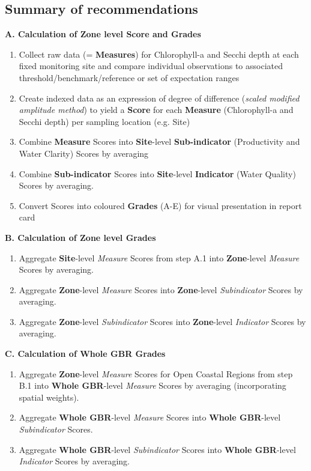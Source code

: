
 

\subsection{Summary of recommendations}


\begin{minipage}[t]{\textwidth}
\textbf{A. Calculation of Zone level Score and Grades}
\begin{enumerate}
\item Collect raw data (= \textbf{Measures}) for Chlorophyll-a and Secchi depth at each fixed monitoring site and compare individual observations to associated threshold/benchmark/reference or set of expectation ranges
\item Create indexed data as an expression of degree of difference (\textit{scaled modified amplitude method}) to yield a \textbf{Score} for each \textbf{Measure} (Chlorophyll-a and Secchi depth) per sampling location (e.g. Site)
\item Combine \textbf{Measure} Scores into \textbf{Site}-level \textbf{Sub-indicator} (Productivity and Water Clarity) Scores by averaging  
\item Combine \textbf{Sub-indicator} Scores into \textbf{Site}-level \textbf{Indicator} (Water Quality) Scores by averaging.
\item Convert Scores into coloured \textbf{Grades} (A-E) for visual presentation in report card
\end{enumerate}
\textbf{B.     Calculation of Zone level Grades}
\begin{enumerate}
\item Aggregate \textbf{Site}-level \textit{Measure} Scores from step A.1 into \textbf{Zone}-level \textit{Measure} Scores by averaging.
\item Aggregate \textbf{Zone}-level \textit{Measure} Scores into \textbf{Zone}-level \textit{Subindicator} Scores by averaging.
\item Aggregate \textbf{Zone}-level \textit{Subindicator} Scores into \textbf{Zone}-level \textit{Indicator} Scores by averaging.
\end{enumerate}
\textbf{C.     Calculation of Whole GBR Grades}
\begin{enumerate}
\item Aggregate \textbf{Zone}-level \textit{Measure} Scores for Open Coastal Regions from step B.1 into \textbf{Whole GBR}-level \textit{Measure} Scores by averaging (incorporating spatial weights).
\item Aggregate \textbf{Whole GBR}-level \textit{Measure} Scores into \textbf{Whole GBR}-level \textit{Subindicator} Scores.
\item Aggregate \textbf{Whole GBR}-level \textit{Subindicator} Scores into \textbf{Whole GBR}-level \textit{Indicator} Scores by averaging. 
\end{enumerate}
\end{minipage}


\clearpage



\newpage



